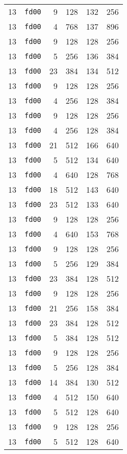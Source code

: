 \documentclass{article}
\begin{document}
\begin{table}[h!]
\begin{tabular}{llrrrl}
    13 & \texttt{fd00} & 9 & 128 & 132 & 256 \\
    13 & \texttt{fd00} & 4 & 768 & 137 & 896 \\
    13 & \texttt{fd00} & 9 & 128 & 128 & 256 \\
    13 & \texttt{fd00} & 5 & 256 & 136 & 384 \\
    13 & \texttt{fd00} & 23 & 384 & 134 & 512 \\
    13 & \texttt{fd00} & 9 & 128 & 128 & 256 \\
    13 & \texttt{fd00} & 4 & 256 & 128 & 384 \\
    13 & \texttt{fd00} & 9 & 128 & 128 & 256 \\
    13 & \texttt{fd00} & 4 & 256 & 128 & 384 \\
    13 & \texttt{fd00} & 21 & 512 & 166 & 640 \\
    13 & \texttt{fd00} & 5 & 512 & 134 & 640 \\
    13 & \texttt{fd00} & 4 & 640 & 128 & 768 \\
    13 & \texttt{fd00} & 18 & 512 & 143 & 640 \\
    13 & \texttt{fd00} & 23 & 512 & 133 & 640 \\
    13 & \texttt{fd00} & 9 & 128 & 128 & 256 \\
    13 & \texttt{fd00} & 4 & 640 & 153 & 768 \\
    13 & \texttt{fd00} & 9 & 128 & 128 & 256 \\
    13 & \texttt{fd00} & 5 & 256 & 129 & 384 \\
    13 & \texttt{fd00} & 23 & 384 & 128 & 512 \\
    13 & \texttt{fd00} & 9 & 128 & 128 & 256 \\
    13 & \texttt{fd00} & 21 & 256 & 158 & 384 \\
    13 & \texttt{fd00} & 23 & 384 & 128 & 512 \\
    13 & \texttt{fd00} & 5 & 384 & 128 & 512 \\
    13 & \texttt{fd00} & 9 & 128 & 128 & 256 \\
    13 & \texttt{fd00} & 5 & 256 & 128 & 384 \\
    13 & \texttt{fd00} & 14 & 384 & 130 & 512 \\
    13 & \texttt{fd00} & 4 & 512 & 150 & 640 \\
    13 & \texttt{fd00} & 5 & 512 & 128 & 640 \\
    13 & \texttt{fd00} & 9 & 128 & 128 & 256 \\
    13 & \texttt{fd00} & 5 & 512 & 128 & 640 \\

\end{tabular}
\end{table}
\end{document}
